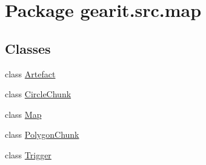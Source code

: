 \hypertarget{namespacegearit_1_1src_1_1map}{\section{Package gearit.\+src.\+map}
\label{namespacegearit_1_1src_1_1map}
}
\subsection*{Classes}
\begin{DoxyCompactItemize}
\item 
class \hyperlink{classgearit_1_1src_1_1map_1_1_artefact}{Artefact}
\item 
class \hyperlink{classgearit_1_1src_1_1map_1_1_circle_chunk}{Circle\+Chunk}
\item 
class \hyperlink{classgearit_1_1src_1_1map_1_1_map}{Map}
\item 
class \hyperlink{classgearit_1_1src_1_1map_1_1_polygon_chunk}{Polygon\+Chunk}
\item 
class \hyperlink{classgearit_1_1src_1_1map_1_1_trigger}{Trigger}
\end{DoxyCompactItemize}
